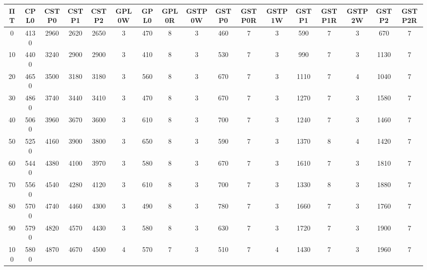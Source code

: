 \begin{tabular}{|c|c|c|c|c|c|c|c|c|c|c|c|c|c|c|c|c|}
\hline
ΠΤ&CPL0&CSTP0&CSTP1&CSTP2&GPL0W&GPL0&GPL0R&GSTP0W&GSTP0&GSTP0R&GSTP1W&GSTP1&GSTP1R&GSTP2W&GSTP2&GSTP2R\\\hline
\hline
0&4130&2960&2620&2650&3&470&8&3&460&7&3&590&7&3&670&7\\
\hline
10&4400&3240&2900&2900&3&410&8&3&530&7&3&990&7&3&1130&7\\
\hline
20&4650&3500&3180&3180&3&560&8&3&670&7&3&1110&7&4&1040&7\\
\hline
30&4860&3740&3440&3410&3&470&8&3&670&7&3&1270&7&3&1580&7\\
\hline
40&5060&3960&3670&3600&3&610&8&3&700&7&3&1240&7&3&1460&7\\
\hline
50&5250&4160&3900&3800&3&650&8&3&590&7&3&1370&8&4&1420&7\\
\hline
60&5440&4380&4100&3970&3&580&8&3&670&7&3&1610&7&3&1810&7\\
\hline
70&5560&4540&4280&4120&3&610&8&3&700&7&3&1330&8&3&1880&7\\
\hline
80&5700&4740&4460&4300&3&490&8&3&780&7&3&1660&7&3&1760&7\\
\hline
90&5790&4820&4570&4430&3&580&8&3&630&7&3&1720&7&3&1900&7\\
\hline
100&5800&4870&4670&4500&4&570&7&3&510&7&4&1430&7&3&1960&7\\
\hline
\end{tabular}
